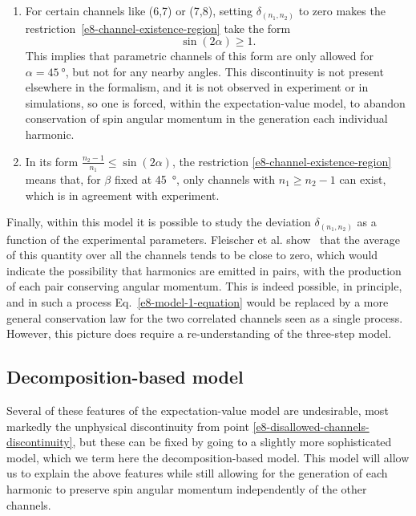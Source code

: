 \begin{enumerate}[label=(\roman*)]
 \item \label{e8-disallowed-channels-discontinuity}
 For certain channels like (6,7) or (7,8), setting $\delta_{(n_1,n_2)}$ to zero makes the restriction~\eqref{e8-channel-existence-region} take the form
 \begin{equation}
 \sin(2\alpha) \geq 1.
 \label{e8-channel-existence-discontinuity}
 \end{equation}
 This implies that parametric channels of this form are only allowed for $\alpha = \SI{45}{\degree}$, but not for any nearby angles. This discontinuity is not present elsewhere in the formalism, and it is not observed in experiment or in simulations, so one is forced, within the expectation-value model, to abandon conservation of spin angular momentum in the generation each individual harmonic.
 
 \item
 In its form $\frac{n_2-1}{n_1}\leq\sin(2\alpha)$, the restriction \eqref{e8-channel-existence-region} means that, for $\beta$ fixed at \SI{45}{\degree}, only channels with $n_1\geq n_2-1$ can exist, which is in agreement with experiment.

\end{enumerate}


Finally, within this model it is possible to study the deviation $\delta_{(n_1,n_2)}$ as a function of the experimental parameters. Fleischer et al. show~\cite{fleischer_spin_2014} that the average of this quantity over all the channels tends to be close to zero, which would indicate the possibility that harmonics are emitted in pairs, with the production of each pair conserving angular momentum. This is indeed possible, in principle, and in such a process Eq.~\eqref{e8-model-1-equation} would be replaced by a more general conservation law for the two correlated channels seen as a single process. However, this picture does require a re-understanding of the three-step model.





\subsection{Decomposition-based model}
\label{sec:decomposition-based-model}

Several of these features of the expectation-value model are undesirable, most markedly the unphysical discontinuity from point \ref{e8-disallowed-channels-discontinuity}, but these can be fixed by going to a slightly more sophisticated model, which we term here the decomposition-based model. This model will allow us to explain the above features while still allowing for the generation of each harmonic to preserve spin angular momentum independently of the other channels.


